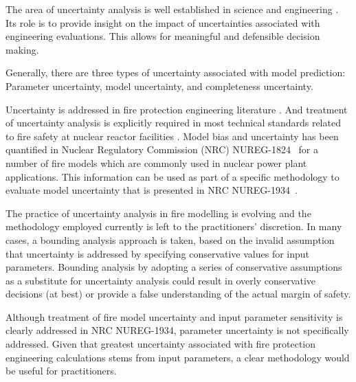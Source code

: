 

The area of uncertainty analysis is well established in science and engineering \cite{Morgan}. 
Its role is to provide insight on the impact of uncertainties associated with engineering evaluations. This allows for meaningful and defensible decision making.

Generally, there are three types of uncertainty associated with model prediction: Parameter uncertainty, model uncertainty, and completeness uncertainty. 


Uncertainty is addressed in fire protection engineering literature \cite{Notarianni:SFPE}. 
And treatment of uncertainty analysis is explicitly required in most technical standards related to fire safety at nuclear reactor facilities \cite{NFPA:805, NUREG:6850}. 
Model bias and uncertainty has been quantified in Nuclear Regulatory Commission (NRC) NUREG-1824~\cite{NUREG_1824_Sup_1} for a number of fire models which are commonly used in nuclear power plant applications. This information can be used as part of a specific methodology to evaluate model uncertainty  that is presented in NRC NUREG-1934~\cite{NUREG_1934}. 


The practice of uncertainty analysis in fire modelling is evolving and the methodology employed currently is left to the practitioners' discretion. In many cases, a bounding analysis approach is taken, based on the invalid assumption that uncertainty is addressed by specifying conservative values for input parameters. Bounding analysis by adopting a series of conservative assumptions as a substitute for uncertainty analysis could result in overly conservative decisions (at best) or provide a false understanding of the actual margin of safety.

Although treatment of fire model uncertainty and input parameter sensitivity is clearly addressed in NRC NUREG-1934, parameter uncertainty is not specifically addressed. Given that greatest uncertainty associated with fire protection engineering calculations stems from input parameters, a clear methodology would be useful for practitioners.

